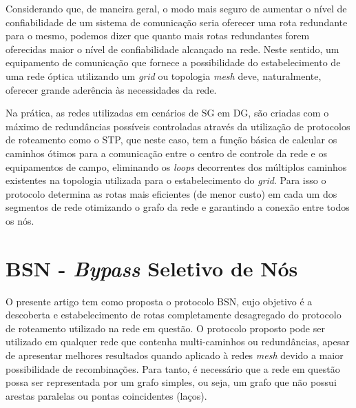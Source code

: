 \documentclass[12pt]{article}
\begin{document}
Considerando que, de maneira geral, o modo mais seguro de aumentar o nível de confiabilidade de um sistema de comunicação seria oferecer uma rota redundante para o mesmo, podemos dizer que quanto mais rotas redundantes forem oferecidas maior o nível de confiabilidade alcançado na rede. Neste sentido, um equipamento de comunicação que fornece a possibilidade do estabelecimento de uma rede óptica utilizando um \emph{grid} ou topologia \emph{mesh} deve, naturalmente, oferecer grande aderência às necessidades da rede.

Na prática, as redes utilizadas em cenários de SG em DG, são criadas com o máximo de redundâncias possíveis controladas através da utilização de protocolos de roteamento como o STP, que neste caso, tem a função básica de calcular os caminhos ótimos para a comunicação entre o centro de controle da rede e os equipamentos de campo, eliminando os \emph{loops} decorrentes dos múltiplos caminhos existentes na topologia utilizada para o estabelecimento do \emph{grid}. Para isso o protocolo determina as rotas mais eficientes (de menor custo) em cada um dos segmentos de rede otimizando o grafo da rede e garantindo a conexão entre todos os nós.

\section{BSN - \emph{Bypass} Seletivo de Nós}
\label{sec:proposta}
O presente artigo tem como proposta o protocolo BSN, cujo objetivo é a descoberta e estabelecimento de rotas completamente desagregado do protocolo de roteamento utilizado na rede em questão. O protocolo proposto pode ser utilizado em qualquer rede que contenha multi-caminhos ou redundâncias, apesar de apresentar melhores resultados quando aplicado à redes \emph{mesh} devido a maior possibilidade de recombinações. Para tanto, é necessário que a rede em questão possa ser representada por um grafo simples, ou seja, um grafo que não possui arestas paralelas ou pontas coincidentes (laços).
\end{document}
